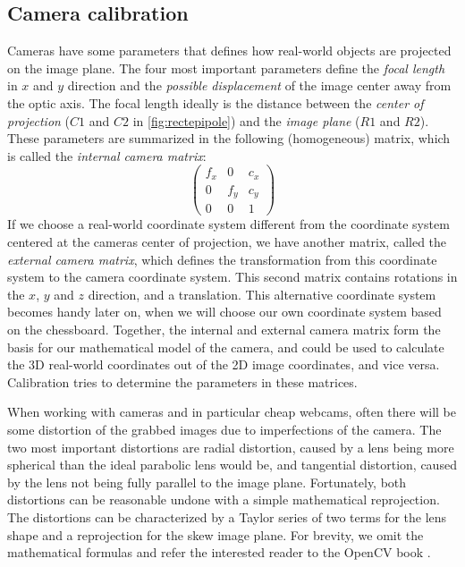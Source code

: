 \documentclass[a4paper]{article}
\begin{document}
\subsection{Camera calibration}
Cameras have some parameters that defines how real-world objects are
projected on the image plane. The four most important parameters define
the \emph{focal length} in $x$ and $y$ direction and the \emph{possible 
displacement} of the image center away from the optic axis. The focal length
ideally is the distance between the \emph{center of projection} ($C1$ and
$C2$ in \ref{fig:rectepipole}) and the \emph{image plane} ($R1$ and $R2$).
These parameters are summarized in the following (homogeneous) matrix,
which is called the \emph{internal camera matrix}:
\[ \left( \begin{array}{ccc}
f_x & 0   & c_x \\
0   & f_y & c_y \\
0   & 0   & 1
\end{array} \right)\] 
If we choose a real-world coordinate system different from the coordinate
system centered at the cameras center of projection, we have another matrix,
called the \emph{external camera matrix}, which defines the transformation from
this coordinate system to the camera coordinate system. This second matrix
contains rotations in the $x$, $y$ and $z$ direction, and a translation.
This alternative coordinate system becomes handy later on, when we will
choose our own coordinate system based on the chessboard.
Together, the internal and external camera matrix form the basis for our
mathematical model of the camera, and could be used to calculate the 3D
real-world coordinates out of the 2D image coordinates, and vice versa.
Calibration tries to determine the parameters in these matrices.

When working with cameras and in particular cheap webcams, often there
will be some distortion of the grabbed images due to imperfections of
the camera. The two most important distortions are radial distortion,
caused by a lens being more spherical than the ideal parabolic lens would
be, and tangential distortion, caused by the lens not being fully parallel
to the image plane. Fortunately, both distortions can be reasonable undone
with a simple mathematical reprojection. The distortions can be
characterized by a Taylor series of two terms for the lens shape and a
reprojection for the skew image plane. For brevity, we omit the mathematical
formulas and refer the interested reader to the OpenCV book
\cite{LearningOpenCV}.
\end{document}
